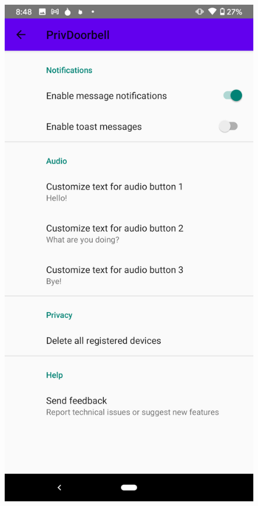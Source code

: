 \begin{figure}
\begin{minipage}[t]{0.3\linewidth}
		\includegraphics[width=\linewidth]{app_sc_management.png}
	\end{minipage}
	\begin{minipage}[t]{0.3\linewidth}

\end{minipage}
\end{figure}
